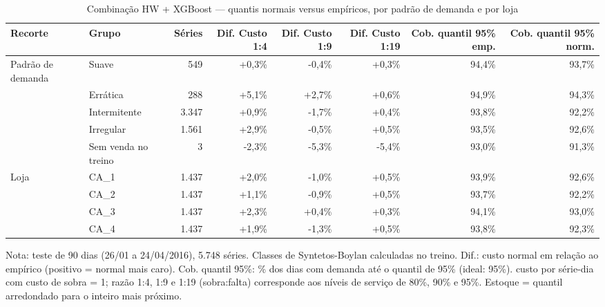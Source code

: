 \begin{table}[htbp]
\centering
\small
\caption{Combinação HW + XGBoost — quantis normais versus empíricos, por padrão de demanda e por loja}
\label{tab:comb_empirico_vs_normal_por_grupo}
\begin{tabular}{llrrrrrr}
\toprule
Recorte & Grupo & Séries & Dif. Custo 1:4 & Dif. Custo 1:9 & Dif. Custo 1:19 & Cob. quantil 95\% emp. & Cob. quantil 95\% norm. \\
\midrule
Padrão de demanda & Suave & 549 & +0,3\% & -0,4\% & +0,3\% & 94,4\% & 93,7\% \\
 & Errática & 288 & +5,1\% & +2,7\% & +0,6\% & 94,9\% & 94,3\% \\
 & Intermitente & 3.347 & +0,9\% & -1,7\% & +0,4\% & 93,8\% & 92,2\% \\
 & Irregular & 1.561 & +2,9\% & -0,5\% & +0,5\% & 93,5\% & 92,6\% \\
 & Sem venda no treino & 3 & -2,3\% & -5,3\% & -5,4\% & 93,0\% & 91,3\% \\
\addlinespace
Loja & CA\_1 & 1.437 & +2,0\% & -1,0\% & +0,5\% & 93,9\% & 92,6\% \\
 & CA\_2 & 1.437 & +1,1\% & -0,9\% & +0,5\% & 93,7\% & 92,2\% \\
 & CA\_3 & 1.437 & +2,3\% & +0,4\% & +0,3\% & 94,1\% & 93,0\% \\
 & CA\_4 & 1.437 & +1,9\% & -1,3\% & +0,5\% & 93,8\% & 92,3\% \\
\bottomrule
\end{tabular}
\par\smallskip
{\footnotesize Nota: teste de 90 dias (26/01 a 24/04/2016), 5.748 séries. Classes de Syntetos-Boylan calculadas no treino. Dif.: custo normal em relação ao empírico (positivo = normal mais caro). Cob. quantil 95\%: \% dos dias com demanda até o quantil de 95\% (ideal: 95\%). custo por série-dia com custo de sobra = 1; razão 1:4, 1:9 e 1:19 (sobra:falta) corresponde aos níveis de serviço de 80\%, 90\% e 95\%. Estoque = quantil arredondado para o inteiro mais próximo.}
\end{table}
